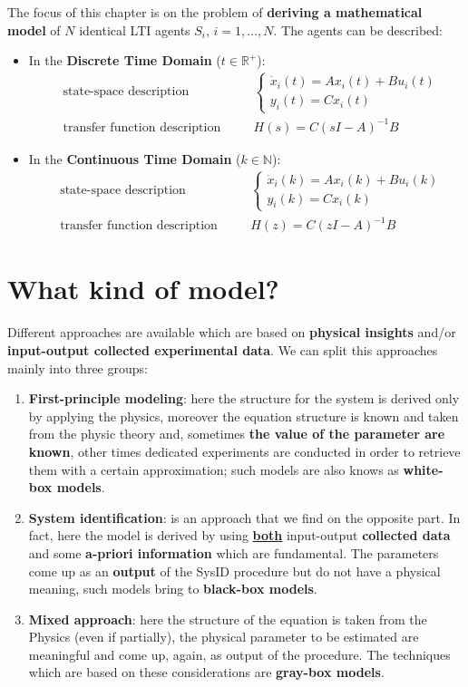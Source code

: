The focus of this chapter is on the problem of \textbf{deriving a mathematical model} of $N$ identical LTI agents $S_i$, $i=1,...,N$. The agents can be described:
\begin{itemize}
    \itemsep0em
    \item In the \textbf{Discrete Time Domain} ($t\in\mathbb{R}^+$):
    \begin{align*}
        &\text{state-space description} &\quad
        &\begin{cases}
            \dot{x}_i(t)=Ax_i(t)+Bu_i(t)\\
            y_i(t)=Cx_i(t)
        \end{cases}\\
        &\text{transfer function description} &\quad
        &H(s)=C(sI-A)^{-1}B
    \end{align*}
    \item In the \textbf{Continuous Time Domain} ($k\in\mathbb{N}$):
    \begin{align*}
        &\text{state-space description} &\quad
        &\begin{cases}
            \dot{x}_i(k)=Ax_i(k)+Bu_i(k)\\
            y_i(k)=Cx_i(k)
        \end{cases}\\
        &\text{transfer function description} &\quad
        &H(z)=C(zI-A)^{-1}B
    \end{align*} 
\end{itemize}

\section{What kind of model?}
\noindent
Different approaches are available which are based on \textbf{physical insights} and/or \textbf{input-output collected experimental data}. We can split this approaches mainly into three groups:
\begin{enumerate}
    \item \textbf{First-principle modeling}: here the structure for the system is derived only by applying the physics, moreover the equation structure is known and taken from the physic theory and, sometimes \textbf{the value of the parameter are known}, other times dedicated experiments are conducted in order to retrieve them with a certain approximation; such models are also knows as \textbf{white-box models}.
    \item \textbf{System identification}: is an approach that we find on the opposite part. In fact, here the model is derived by using \underline{\textbf{both}} input-output \textbf{collected data} and some \textbf{a-priori information} which are fundamental. The parameters come up as an \textbf{output} of the SysID procedure but do not have a physical meaning, such models bring to \textbf{black-box models}. 
    \item \textbf{Mixed approach}: here the structure of the equation is taken from the Physics (even if partially), the physical parameter to be estimated are meaningful and come up, again, as output of the procedure. The techniques which are based on these considerations are  \textbf{gray-box models}.
\end{enumerate}


